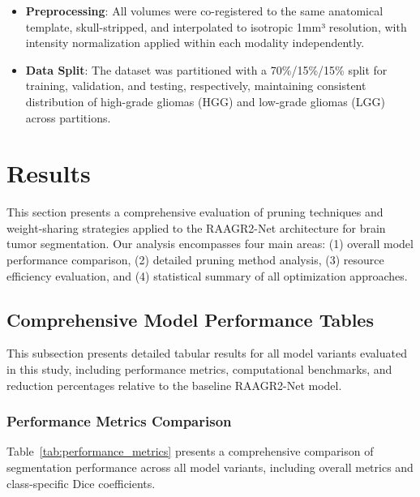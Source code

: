 \documentclass[12pt,a4paper]{article}
\begin{document}
\begin{enumerate}
\begin{itemize}
    \item \textbf{Preprocessing}: All volumes were co-registered to the same anatomical template, skull-stripped, and interpolated to isotropic 1mm³ resolution, with intensity normalization applied within each modality independently.
    
    \item \textbf{Data Split}: The dataset was partitioned with a 70\%/15\%/15\% split for training, validation, and testing, respectively, maintaining consistent distribution of high-grade gliomas (HGG) and low-grade gliomas (LGG) across partitions.

\end{itemize}


\section{Results}
\label{sec:results}

This section presents a comprehensive evaluation of pruning techniques and weight-sharing strategies applied to the RAAGR2-Net architecture for brain tumor segmentation. Our analysis encompasses four main areas: (1) overall model performance comparison, (2) detailed pruning method analysis, (3) resource efficiency evaluation, and (4) statistical summary of all optimization approaches.

\subsection{Comprehensive Model Performance Tables}
\label{subsec:performance_tables}

This subsection presents detailed tabular results for all model variants evaluated in this study, including performance metrics, computational benchmarks, and reduction percentages relative to the baseline RAAGR2-Net model.

\subsubsection{Performance Metrics Comparison}

Table~\ref{tab:performance_metrics} presents a comprehensive comparison of segmentation performance across all model variants, including overall metrics and class-specific Dice coefficients.


\end{enumerate}
\end{document}
